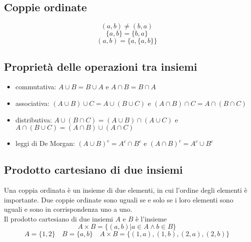 \documentclass{article}
\begin{document}
\subsection{Coppie ordinate}
\begin{equation}
    (a,b) \not= (b,a) %
\end{equation}
\begin{equation}    
    \{a,b\} = \{b,a\}
\end{equation}
\begin{equation}    
    (a,b) = \{a,\{a,b\}\}
\end{equation}

\subsection{Proprietà delle operazioni tra insiemi}
\begin{itemize}
    \item commutativa: $A \cup B = B \cup A$ e $A \cap B = B \cap A$
    \item associativa: $(A \cup B) \cup C = A \cup (B \cup C)$ e $(A \cap B) \cap C = A \cap (B \cap C)$
    \item distributiva: $A \cup (B \cap C) = (A \cup B) \cap (A \cup C)$ e $A \cap (B \cup C) = (A \cap B) \cup (A \cap C)$
    \item leggi di De Morgan: $(A \cup B)^c = A^c \cap B^c$ e $(A \cap B)^c = A^c \cup B^c$
\end{itemize}

\subsection{Prodotto cartesiano di due insiemi}
Una coppia ordinata è un insieme di due elementi, in cui l'ordine degli elementi è importante. Due coppie ordinate sono uguali se e solo se i loro elementi sono uguali e sono in corrispondenza uno a uno.\\

Il prodotto cartesiano di due insiemi $A$ e $B$ è l'insieme 
\begin{equation}
    A \times B = \{(a,b) | a \in A \land b \in B\}
\end{equation}
\begin{equation}
    A = \{1,2\} \quad B = \{a,b\} \quad A \times B = \{(1,a),(1,b),(2,a),(2,b)\}
\end{equation}
\end{document}
